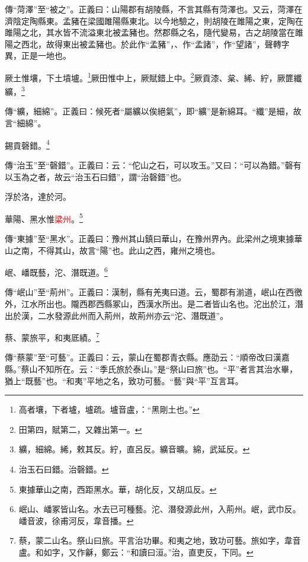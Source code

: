 {\noindent\zhuan{}\fzbyks 傳“菏澤”至“被之”。正義曰：山陽郡有胡陵縣，不言其縣有菏澤也。又云，菏澤在濟陰定陶縣東。孟豬在梁國雎陽縣東北。以今地驗之，則胡陵在雎陽之東，定陶在雎陽之北，其水皆不流溢東北被孟豬也。然郡縣之名，隨代變易，古之胡陵當在雎陽之西北，故得東出被孟豬也。於此作“孟豬”，、作“孟諸”，作“望諸”，聲轉字異，正是一地也。 \par}

厥土惟壤，下土墳壚。\footnote{高者壤，下者壚，壚疏。壚音盧，：“黑剛土也。”}厥田惟中上，厥賦錯上中。\footnote{田第四，賦第二，又雜出第一。}厥貢漆、枲、絺、紵，厥篚纖纊，\footnote{纊，細綿。絺，敕其反。紵，直呂反。纊音曠。綿，武延反。}

{\noindent\zhuan{}\fzbyks 傳“纊，細綿”。正義曰：候死者“屬纊以俟絕氣”，即“纊”是新綿耳。“纖”是細，故言“細綿”。 \par}

錫貢磬錯。\footnote{治玉石曰錯。治磬錯。}

{\noindent\zhuan{}\fzbyks 傳“治玉”至“磬錯”。正義曰：云：“佗山之石，可以攻玉。”又曰：“可以為錯。”磬有以玉為之者，故云“治玉石曰錯”，謂“治磬錯”也。 \par}

浮於洛，達於河。

華陽、黑水惟\textcolor{red}{梁州}。\footnote{東據華山之南，西距黑水。華，胡化反，又胡瓜反。}

{\noindent\zhuan{}\fzbyks 傳“東據”至“黑水”。正義曰：豫州其山鎮曰華山，在豫州界內。此梁州之境東據華山之南，不得其山，故言“陽”也。此山之西，雍州之境也。 \par}

岷、嶓既藝，沱、潛既道。\footnote{岷山、嶓冢皆山名。水去已可種藝。沱、潛發源此州，入荊州。岷，武巾反。嶓音波，徐甫河反，韋音播。}

{\noindent\zhuan{}\fzbyks 傳“岷山”至“荊州”。正義曰：漢制，縣有羌夷曰道。云，蜀郡有湔道，岷山在西徼外，江水所出也。隴西郡西縣冢山，西漢水所出。是二者皆山名也。沱出於江，潛出於漢，二水發源此州而入荊州，故荊州亦云“沱、潛既道”。 \par}

蔡、蒙旅平，和夷厎績。\footnote{蔡，蒙二山名。祭山曰旅。平言治功畢。和夷之地，致功可藝。旅如字，韋音盧。和如字，又作龢，鄭云：“和讀曰洹。”治，直吏反，下同。}

{\noindent\zhuan{}\fzbyks 傳“蔡蒙”至“可藝”。正義曰：云，蒙山在蜀郡青衣縣。應劭云：“順帝改曰漢嘉縣。”蔡山不知所在。云：“季氏旅於泰山。”是“祭山曰旅”也。“平”者言其治水畢，猶上“既藝”也。“和夷”平地之名，致功可藝。“藝”與“平”互言耳。 \par}

